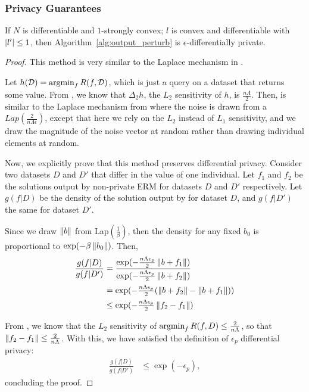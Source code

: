 \documentclass{article} %
\begin{document}
\subsubsection{Privacy Guarantees}
\begin{theorem}
If $N$ is differentiable and $1$-strongly convex; $l$ is convex and differentiable with $\left\lvert l'\right\rvert \le 1$, then Algorithm~\ref{alg:output_perturb} is $\epsilon$-differentially private.
\end{theorem}

\begin{proof}
This method is very similar to the Laplace mechanism in .

Let $h(\mathcal{D}) = \operatorname*{argmin}_f R(f, \mathcal{D})$, which is just a query on a dataset that
returns some value. From , we know that
$\Delta_2 h$, the $L_2$ sensitivity of $h$, is $\frac{n \Lambda}{2}$. Then,
 is similar to the Laplace mechanism from
 where the noise is drawn from a
$Lap(\frac{2}{n \Lambda \epsilon})$, except that here we rely on the $L_2$
instead of $L_1$ sensitivity, and we draw the magnitude of the noise vector at
random rather than drawing individual elements at random.

Now, we explicitly prove that this method preserves differential privacy.
Consider two datasets $D$ and $D'$ that differ in the value of one individual.
Let $f_1$ and $f_2$ be the solutions output by non-private ERM for datasets $D$
and $D'$ respectively. Let $g(f | D)$ be the density of the solution output by
 for dataset $D$, and $g(f | D')$ the same for dataset
$D'$.

Since we draw $\left\lVert b\right\rVert$ from Lap$(\frac{1}{\beta})$, then the density for
any fixed $b_0$ is proportional to $\exp(-\beta \left\lVert b_0\right\rVert)$. Then,
\begin{align*}
\frac{g(f | D)}{g(f | D')}
    &= \frac{
         \exp(-\tfrac{n\Lambda\epsilon_p}{2} \left\lVert b + f_1\right\rVert)
       }{
         \exp(-\tfrac{n\Lambda\epsilon_p}{2} \left\lVert b + f_2\right\rVert)
       } \\
    &= \exp(-\tfrac{n\Lambda\epsilon_p}{2} (\left\lVert b + f_2\right\rVert - \left\lVert b + f_1\right\rVert)) \\
    &\leq \exp(-\tfrac{n\Lambda\epsilon_p}{2} \left\lVert f_2 - f_1\right\rVert)
\end{align*}

From , we know that the $L_2$ sensitivity
of $\operatorname*{argmin}_f R(f, D) \leq \frac{2}{n \Lambda}$, so that
$\left\lVert f_2 - f_1\right\rVert \leq \frac{2}{n \Lambda}$. With this, we have satisfied the
definition of $\epsilon_p$ differential privacy:
\begin{align*}
\frac{g(f | D)}{g(f | D')} &\leq \exp(-\epsilon_p),
\end{align*}
concluding the proof.
\end{proof}
\end{document}
